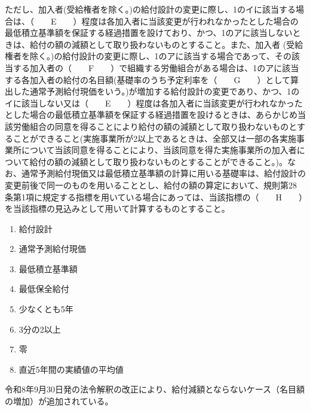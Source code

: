 \begin{fillblank}[自作 \ 2026/10/10]
\begin{lawstructure}
\begin{lawarticle}{}{}
      \hspace*{1em}%
      ただし、加入者(受給権者を除く。)の給付設計の変更に際し、1のイに該当する場合は、（　　E　　）程度は各加入者に当該変更が行われなかったとした場合の最低積立基準額を保証する経過措置を設けており、かつ、1のアに該当しないときは、給付の額の減額として取り扱わないものとすること。また、加入者 (受給権者を除く。)の給付設計の変更に際し、1のアに該当する場合であって、その該当する加入者の（　　F　　）で組織する労働組合がある場合は、1のアに該当する各加入者の給付の名目額(基礎率のうち予定利率を（　　G　　）として算出した通常予測給付現価をいう。)が増加する給付設計の変更であり、かつ、1のイに該当しない又は（　　E　　）程度は各加入者に当該変更が行われなかったとした場合の最低積立基準額を保証する経過措置を設けるときは、あらかじめ当該労働組合の同意を得ることにより給付の額の減額として取り扱わないものとすることができること(実施事業所が2以上であるときは、全部又は一部の各実施事業所について当該同意を得ることにより、当該同意を得た実施事業所の加入者について給付の額の減額として取り扱わないものとすることができること。)。なお、通常予測給付現価又は最低積立基準額の計算に用いる基礎率は、給付設計の変更前後で同一のものを用いることとし、給付の額の算定において、規則第28 条第1項に規定する指標を用いている場合にあっては、当該指標の（　　H　　）を当該指標の見込みとして用いて計算するものとすること。

    \end{lawarticle}
  \end{lawstructure}
\end{fillblank}

\begin{answerbox}
  \begin{enumerate}[A:]
    \item 給付設計
    \item 通常予測給付現価
    \item 最低積立基準額
    \item 最低保全給付
    \item 少なくとも5年
    \item 3分の2以上
    \item 零
    \item 直近5年間の実績値の平均値
  \end{enumerate}
\end{answerbox}

\begin{explanationbox}
  令和8年9月30日発の法令解釈の改正により、給付減額とならないケース（名目額の増加）が追加されている。
\end{explanationbox}

